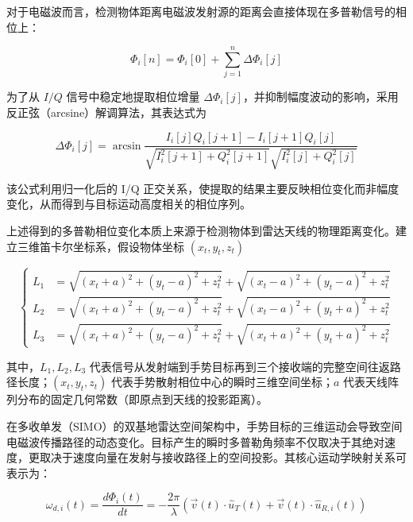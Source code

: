 对于电磁波而言，检测物体距离电磁波发射源的距离会直接体现在多普勒信号的相位上：

\begin{equation}
    \Phi_{i}[n] = \Phi_{i}[0] + \sum_{j=1}^{n}\Delta\Phi_{i}[j]
\end{equation}

为了从 $I/Q$ 信号中稳定地提取相位增量 $\Delta\Phi_{i}[j]$，并抑制幅度波动的影响，采用反正弦（arcsine）解调算法，其表达式为

\begin{equation}
    \Delta\Phi_{i}[j] = \arcsin\frac{I_{i}[j]Q_{i}[j+1] - I_{i}[j+1]Q_{i}[j]}{\sqrt{I_{i}^{2}[j+1] + Q_{i}^{2}[j+1]}\sqrt{I_{i}^{2}[j] + Q_{i}^{2}[j]}}
\end{equation}

该公式利用归一化后的 I/Q 正交关系，使提取的结果主要反映相位变化而非幅度变化，从而得到与目标运动高度相关的相位序列。

上述得到的多普勒相位变化本质上来源于检测物体到雷达天线的物理距离变化。建立三维笛卡尔坐标系，假设物体坐标 $(x_{t}, y_{t}, z_{t})$

\begin{equation}
    \left\{ \begin{aligned}
    L_{1} &= \sqrt{(x_{t}+a)^{2}+(y_{t}-a)^{2}+z_{t}^{2}} + \sqrt{(x_{t}-a)^{2}+(y_{t}-a)^{2}+z_{t}^{2}} \\
    L_{2} &= \sqrt{(x_{t}+a)^{2}+(y_{t}-a)^{2}+z_{t}^{2}} + \sqrt{(x_{t}-a)^{2}+(y_{t}+a)^{2}+z_{t}^{2}} \\
    L_{3} &= \sqrt{(x_{t}+a)^{2}+(y_{t}-a)^{2}+z_{t}^{2}} + \sqrt{(x_{t}+a)^{2}+(y_{t}+a)^{2}+z_{t}^{2}}
    \end{aligned} \right.
\end{equation}

其中，$L_{1}, L_{2}, L_{3}$ 代表信号从发射端到手势目标再到三个接收端的完整空间往返路径长度；$(x_{t}, y_{t}, z_{t})$ 代表手势散射相位中心的瞬时三维空间坐标；$a$ 代表天线阵列分布的固定几何常数（即原点到天线的投影距离）。

在多收单发（SIMO）的双基地雷达空间架构中，手势目标的三维运动会导致空间电磁波传播路径的动态变化。目标产生的瞬时多普勒角频率不仅取决于其绝对速度，更取决于速度向量在发射与接收路径上的空间投影。其核心运动学映射关系可表示为：

\begin{equation}
    \omega_{d,i}(t) = \frac{d\Phi_{i}(t)}{dt} = -\frac{2\pi}{\lambda}\left(\vec{v}(t) \cdot \hat{u}_{T}(t) + \vec{v}(t) \cdot \hat{u}_{R,i}(t)\right)
\end{equation}

